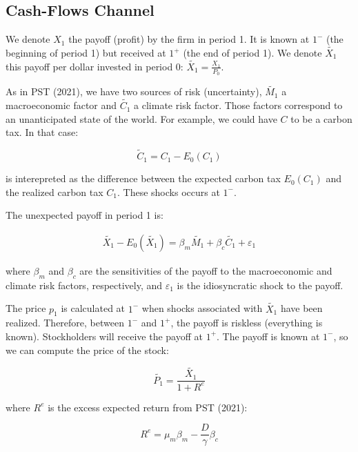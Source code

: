 \subsection{Cash-Flows Channel}

We denote $X_1$ the payoff (profit) by the
firm in period 1. It is known at $1^{-}$ (the beginning
of period 1) but received at $1^{+}$ (the end of period 1).
We denote $\tilde{X_1}$ this payoff per dollar 
invested in period 0: $\tilde{X_1} = \frac{X_1}{P_0}$.

As in PST (2021), we have two sources of risk (uncertainty), $\tilde{M_1}$
a macroeconomic factor and $\tilde{C_1}$ a climate risk factor.
Those factors correspond to an unanticipated state of the world. 
For example, we could have $C$ to be a carbon tax. In that case:

\begin{equation}
    \tilde{C}_1 = C_1 - E_0(C_1)
\end{equation}

is interepreted as the difference between the expected carbon tax 
$E_0(C_1)$ and the realized carbon tax $C_1$.
These shocks occurs at $1^{-}$.

The unexpected payoff in period 1 is:

\begin{equation}
    \begin{aligned}
    \tilde{X_1} - E_0(\tilde{X_1}) = \beta_m \tilde{M_1} + \beta_{c} \tilde{C_1} + \varepsilon_1
    \end{aligned}
\end{equation}

where $\beta_m$ and $\beta_{c}$ are the sensitivities of the payoff to the macroeconomic and climate risk factors, respectively, 
and $\varepsilon_1$ is the idiosyncratic shock to the payoff.


The price $p_1$ is calculated at $1^{-}$ when
shocks associated with $\tilde{X_1}$ 
have been realized. Therefore, 
between $1^{-}$ and $1^{+}$, the payoff is
riskless (everything is known).
Stockholders will 
receive the payoff at $1^{+}$.
The payoff is known at $1^{-}$, so 
we can compute the price of the stock:

\begin{equation}
    \tilde{P_1} = \frac{\tilde{X_1}}{1 + R^e}
\end{equation}

where $R^e$ is the excess expected return 
from PST (2021):

\begin{equation}
    R^e = \mu_m \beta_m - \frac{D}{\gamma} \beta_{c}
\end{equation}


